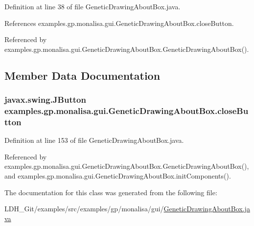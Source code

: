 Definition at line 38 of file Genetic\-Drawing\-About\-Box.\-java.



References examples.\-gp.\-monalisa.\-gui.\-Genetic\-Drawing\-About\-Box.\-close\-Button.



Referenced by examples.\-gp.\-monalisa.\-gui.\-Genetic\-Drawing\-About\-Box.\-Genetic\-Drawing\-About\-Box().



\subsection{Member Data Documentation}
\hypertarget{classexamples_1_1gp_1_1monalisa_1_1gui_1_1_genetic_drawing_about_box_a1a01e65f3fe0892a6f7b0238f7b078ba}{
\subsubsection[{close\-Button}]{\setlength{\rightskip}{0pt plus 5cm}javax.\-swing.\-J\-Button examples.\-gp.\-monalisa.\-gui.\-Genetic\-Drawing\-About\-Box.\-close\-Button\hspace{0.3cm}{\ttfamily [private]}}}\label{classexamples_1_1gp_1_1monalisa_1_1gui_1_1_genetic_drawing_about_box_a1a01e65f3fe0892a6f7b0238f7b078ba}


Definition at line 153 of file Genetic\-Drawing\-About\-Box.\-java.



Referenced by examples.\-gp.\-monalisa.\-gui.\-Genetic\-Drawing\-About\-Box.\-Genetic\-Drawing\-About\-Box(), and examples.\-gp.\-monalisa.\-gui.\-Genetic\-Drawing\-About\-Box.\-init\-Components().



The documentation for this class was generated from the following file\-:\begin{DoxyCompactItemize}
\item 
L\-D\-H\-\_\-\-Git/examples/src/examples/gp/monalisa/gui/\hyperlink{gp_2monalisa_2gui_2_genetic_drawing_about_box_8java}{Genetic\-Drawing\-About\-Box.\-java}\end{DoxyCompactItemize}
